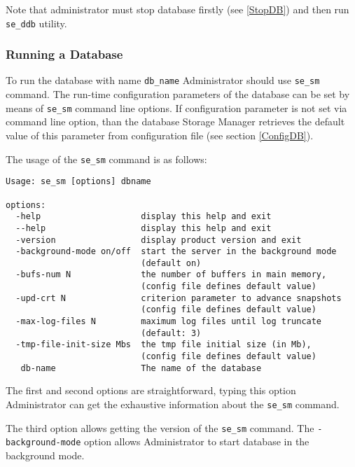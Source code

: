 \documentclass[a4paper,12pt]{article}
\begin{document}
Note that administrator must stop database firstly (see \ref{StopDB}) and then
run \verb!se_ddb! utility.


\subsubsection{Running a Database}
\label{RunDB}

To run the database with name \verb!db_name! Administrator should use
\verb!se_sm! command. The run-time configuration parameters of the database can
be set by means of \verb!se_sm! command line options. If configuration parameter
is not set via command line option, than the database Storage Manager retrieves
the default value of this parameter from configuration file (see section
\ref{ConfigDB}).

The usage of the \verb!se_sm! command is as follows:

\small{
\begin{verbatim}
Usage: se_sm [options] dbname

options:
  -help                    display this help and exit
  --help                   display this help and exit
  -version                 display product version and exit
  -background-mode on/off  start the server in the background mode
                           (default on)
  -bufs-num N              the number of buffers in main memory,
                           (config file defines default value)
  -upd-crt N               criterion parameter to advance snapshots
                           (config file defines default value)
  -max-log-files N         maximum log files until log truncate
                           (default: 3)
  -tmp-file-init-size Mbs  the tmp file initial size (in Mb),
                           (config file defines default value)
   db-name                 The name of the database
\end{verbatim}}

The first and second options are straightforward, typing this option
Administrator can get the exhaustive information about the \verb!se_sm! command.

The third option allows getting the version of the \verb!se_sm! command. The
\verb!-background-mode! option allows Administrator to start database in the
background mode.
\end{document}
